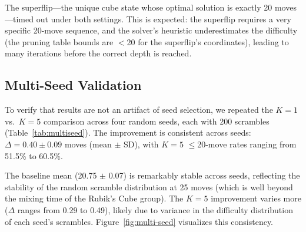 \documentclass[conference]{IEEEtran}
\begin{document}
The superflip---the unique cube state whose optimal solution is exactly 20 moves---timed out under both settings. This is expected: the superflip requires a very specific 20-move sequence, and the solver's heuristic underestimates the difficulty (the pruning table bounds are $<$20 for the superflip's coordinates), leading to many iterations before the correct depth is reached.

\FloatBarrier
\subsection{Multi-Seed Validation}
\label{sec:multiseed}

To verify that results are not an artifact of seed selection, we repeated the $K{=}1$ vs.\ $K{=}5$ comparison across four random seeds, each with 200 scrambles (Table~\ref{tab:multiseed}). The improvement is consistent across seeds: $\Delta = 0.40 \pm 0.09$ moves (mean $\pm$ SD), with $K{=}5$ $\leq$20-move rates ranging from 51.5\% to 60.5\%.

\begin{table}[htbp]
\centering
\caption{Multi-seed validation: $K{=}1$ vs.\ $K{=}5$ (200 scrambles each).}
\label{tab:multiseed}
\end{table}
\FloatBarrier

The baseline mean (20.75 $\pm$ 0.07) is remarkably stable across seeds, reflecting the stability of the random scramble distribution at 25 moves (which is well beyond the mixing time of the Rubik's Cube group). The $K{=}5$ improvement varies more ($\Delta$ ranges from 0.29 to 0.49), likely due to variance in the difficulty distribution of each seed's scrambles. Figure~\ref{fig:multi-seed} visualizes this consistency.
\end{document}
